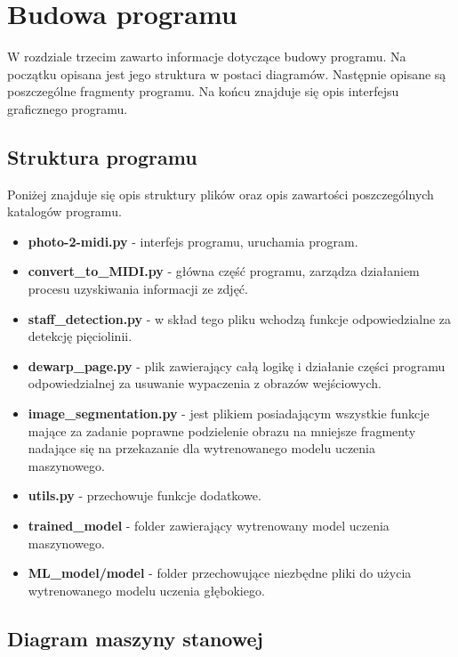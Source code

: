 \chapter{Budowa programu}
W rozdziale trzecim zawarto informacje dotyczące budowy programu. Na początku opisana jest jego struktura w postaci diagramów. Następnie opisane są poszczególne fragmenty programu. Na końcu znajduje się opis interfejsu graficznego programu.


\section{Struktura programu}

Poniżej znajduje się opis struktury plików oraz opis zawartości poszczególnych katalogów programu.

\begin{itemize}
	\item \textbf{photo-2-midi.py} - interfejs programu, uruchamia program.
	\item \textbf{convert\_to\_MIDI.py} - główna część programu, zarządza działaniem procesu uzyskiwania informacji ze zdjęć.
	\item \textbf{staff\_detection.py} - w skład tego pliku wchodzą funkcje odpowiedzialne za detekcję pięciolinii.
	\item \textbf{dewarp\_page.py} - plik zawierający całą logikę i działanie części programu odpowiedzialnej za usuwanie wypaczenia z obrazów wejściowych.
	\item \textbf{image\_segmentation.py} - jest plikiem posiadającym wszystkie funkcje mające za zadanie poprawne podzielenie obrazu na mniejsze fragmenty nadające się na przekazanie dla wytrenowanego modelu uczenia maszynowego.
	\item \textbf{utils.py} - przechowuje funkcje dodatkowe.
	\item \textbf{trained\_model} - folder zawierający wytrenowany model uczenia maszynowego.
	\item \textbf{ML\_model/model} - folder przechowujące niezbędne pliki do użycia wytrenowanego modelu uczenia głębokiego.
\end{itemize}

\section{Diagram maszyny stanowej}

